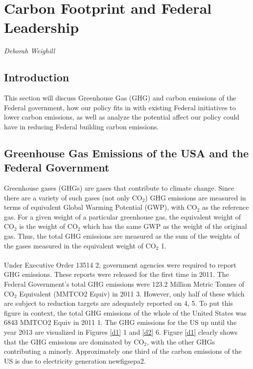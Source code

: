 \section{Carbon Footprint and Federal Leadership}
\textit{Deborah Weighill}

\subsection{Introduction}
This section will discuss Greenhouse Gas (GHG) and carbon emissions of the Federal government, how our policy fits in with existing Federal initiatives to lower carbon emissions, as well as analyze the potential affect our policy could have in reducing Federal building carbon emissions.

\subsection{Greenhouse Gas Emissions of the USA and the Federal Government}
Greenhouse gases (GHGs) are gases that contribute to climate change. Since there are a variety of such gases (not only CO$_{2}$) GHG emissions are measured in terms of equivalent Global Warming Potential (GWP), with CO$_{2}$ as the reference gas. For a given weight of a particular greenhouse gas, the equivalent weight of CO$_{2}$ is the weight of CO$_{2}$ which has the same GWP as the weight of the original gas. Thus, the total GHG emissions are measured as the sum of the weights of the gases measured in the equivalent weight of CO$_{2}$ \cite{debbie}{1}.
\\\\
\noindent Under Executive Order 13514 \cite{debbie}{2}, government agencies were required to report GHG emissions. These reports were released for the first time in 2011. The Federal Government's total GHG emissions were 123.2 Million Metric Tonnes of CO$_{2}$ Equivalent (MMTCO2 Equiv) in 2011 \cite{debbie}{3}. However, only half of these which are subject to reduction targets are adequately reported on \cite{debbie}{4, 5}. To put this figure in context, the total GHG emissions of the whole of the United States was 6843 MMTCO2 Equiv in 2011 \cite{debbie}{1}. The GHG emissions for the US up until the year 2013 are visualized in Figures \ref{d1} \cite{debbie}{1} and \ref{d2} \cite{debbie}{6}. Figure \ref{d1} clearly shows that the GHG emissions are dominated by CO$_{2}$, with the other GHGs contributing a minorly. Approximately one third of the carbon emissions of the US is due to electricity generation \cite{debbie}{newfigsepa2}.

